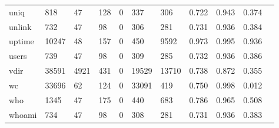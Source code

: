 \begin{longtable}{lp{1.10cm}p{1.10cm}p{1.10cm}p{1.10cm}p{1.10cm}p{1.10cm}p{1.10cm}p{1.10cm}p{1.10cm}p{1.10cm}}
uniq      &                    818 &                                 47 &                               128 &                                0 &                               337 &                             306 &                          0.722 &                                 0.943 &                               0.374 \\
unlink    &                    732 &                                 47 &                                98 &                                0 &                               306 &                             281 &                          0.731 &                                 0.936 &                               0.384 \\
uptime    &                  10247 &                                 48 &                               157 &                                0 &                               450 &                            9592 &                          0.973 &                                 0.995 &                               0.936 \\
users     &                    739 &                                 47 &                                98 &                                0 &                               309 &                             285 &                          0.732 &                                 0.936 &                               0.386 \\
vdir      &                  38591 &                               4921 &                               431 &                                0 &                             19529 &                           13710 &                          0.738 &                                 0.872 &                               0.355 \\
wc        &                  33696 &                                 62 &                               124 &                                0 &                             33091 &                             419 &                          0.750 &                                 0.998 &                               0.012 \\
who       &                   1345 &                                 47 &                               175 &                                0 &                               440 &                             683 &                          0.786 &                                 0.965 &                               0.508 \\
whoami    &                    734 &                                 47 &                                98 &                                0 &                               308 &                             281 &                          0.731 &                                 0.936 &                               0.383 \\

\end{longtable}

